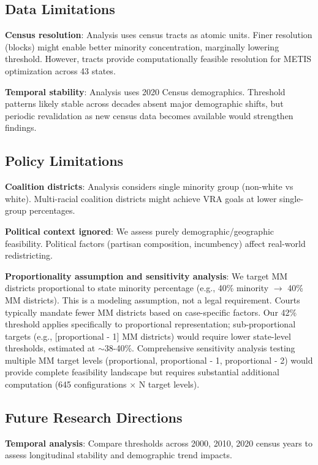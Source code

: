 \subsection{Data Limitations}

\textbf{Census resolution}: Analysis uses census tracts as atomic units. Finer resolution (blocks) might enable better minority concentration, marginally lowering threshold. However, tracts provide computationally feasible resolution for METIS optimization across 43 states.

\textbf{Temporal stability}: Analysis uses 2020 Census demographics. Threshold patterns likely stable across decades absent major demographic shifts, but periodic revalidation as new census data becomes available would strengthen findings.

\subsection{Policy Limitations}

\textbf{Coalition districts}: Analysis considers single minority group (non-white vs white). Multi-racial coalition districts might achieve VRA goals at lower single-group percentages.

\textbf{Political context ignored}: We assess purely demographic/geographic feasibility. Political factors (partisan composition, incumbency) affect real-world redistricting.

\textbf{Proportionality assumption and sensitivity analysis}: We target MM districts proportional to state minority percentage (e.g., 40\% minority $\rightarrow$ 40\% MM districts). This is a modeling assumption, not a legal requirement. Courts typically mandate fewer MM districts based on case-specific factors. Our 42\% threshold applies specifically to proportional representation; sub-proportional targets (e.g., [proportional - 1] MM districts) would require lower state-level thresholds, estimated at $\sim$38-40\%. Comprehensive sensitivity analysis testing multiple MM target levels (proportional, proportional - 1, proportional - 2) would provide complete feasibility landscape but requires substantial additional computation (645 configurations $\times$ N target levels).

\subsection{Future Research Directions}

\textbf{Temporal analysis}: Compare thresholds across 2000, 2010, 2020 census years to assess longitudinal stability and demographic trend impacts.

